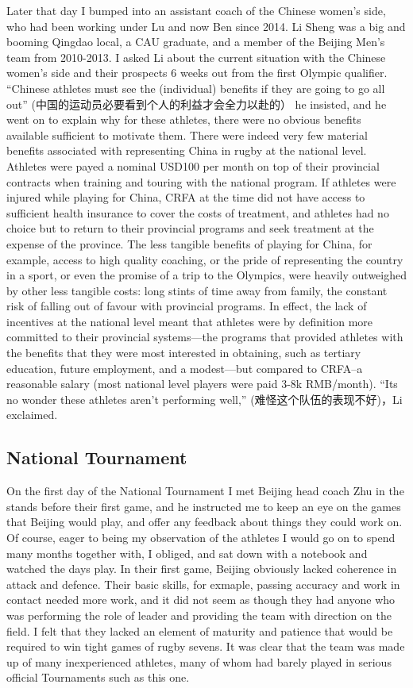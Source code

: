 Later that day I bumped into an assistant coach of the Chinese women's side, who had been working under Lu and now Ben since 2014.  Li Sheng was a big and booming Qingdao local, a CAU graduate, and a member of the Beijing Men's team from 2010-2013.  I asked Li about the current situation with the Chinese women's side and their prospects 6 weeks out from the first Olympic qualifier.  ``Chinese athletes must see the (individual) benefits if they are going to go all out'' (中国的运动员必要看到个人的利益才会全力以赴的） he insisted, and he went on to explain why for these athletes, there were no obvious benefits available sufficient to motivate them.  There were indeed very few material benefits associated with representing China in rugby at the national level.  Athletes were payed a nominal USD100 per month on top of their provincial contracts when training and touring with the national program.  If athletes were injured while playing for China, CRFA at the time did not have access to sufficient health insurance to cover the costs of treatment, and athletes had no choice but to return to their provincial programs and seek treatment at the expense of the province.  The less tangible benefits of playing for China, for example, access to high quality coaching, or the pride of representing the country in a sport, or even the promise of a trip to the Olympics, were heavily outweighed by other less tangible costs: long stints of time away from family, the constant risk of falling out of favour with provincial programs.  In effect, the lack of incentives at the national level meant that athletes were by definition more committed to their provincial systems---the programs that provided athletes with the benefits that they were most interested in obtaining, such as tertiary education, future employment, and a modest---but compared to CRFA--a reasonable salary (most national level players were paid 3-8k RMB/month). ``Its no wonder these athletes aren't performing well,'' (难怪这个队伍的表现不好)，Li exclaimed.

\subsection{National Tournament}

On the first day of the National Tournament I met Beijing head coach Zhu in the stands before their first game, and he instructed me to keep an eye on the games that Beijing would play, and offer any feedback about things they could work on.  Of course, eager to being my observation of the athletes I would go on to spend many months together with, I obliged, and sat down with a notebook and watched the days play.  In their first game, Beijing obviously lacked coherence in attack and defence.  Their basic skills, for exmaple, passing accuracy and work in contact needed more work, and it did not seem as though they had anyone who was performing the role of leader and providing the team with direction on the field.  I felt that they lacked an element of maturity and patience that would be required to win tight games of rugby sevens. It was clear that the team was made up of many inexperienced athletes, many of whom had barely played in serious official Tournaments such as this one.

